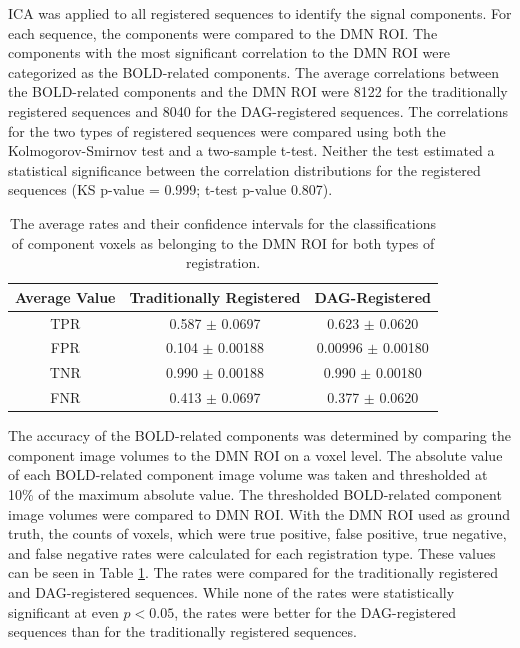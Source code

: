 ICA was applied to all registered sequences to identify the signal components. For each sequence, the components were compared to the DMN ROI. The components with the most significant correlation to the DMN ROI were categorized as the BOLD-related components. The average correlations between the BOLD-related components and the DMN ROI were 8122 for the traditionally registered sequences and 8040 for the DAG-registered sequences. The correlations for the two types of registered sequences were compared using both the Kolmogorov-Smirnov test and a two-sample t-test. Neither the test estimated a statistical significance between the correlation distributions for the registered sequences (KS p-value = 0.999; t-test p-value 0.807).

\begin{table}
\centering
\caption{The average rates and their confidence intervals for the classifications of component voxels as belonging to the DMN ROI for both types of registration.}
\label{tab:spectr-avg-rates}
\begin{tabular}{|c|c|c|}
\hline
\textbf{Average Value} & \textbf{Traditionally Registered} & \textbf{DAG-Registered} \\ \hline
TPR                    & 0.587 $\pm$ 0.0697                & 0.623 $\pm$ 0.0620      \\ \hline
FPR                    & 0.104 $\pm$ 0.00188               & 0.00996 $\pm$ 0.00180   \\ \hline
TNR                    & 0.990 $\pm$ 0.00188               & 0.990 $\pm$ 0.00180     \\ \hline
FNR                    & 0.413 $\pm$ 0.0697                & 0.377 $\pm$ 0.0620      \\ \hline
\end{tabular}
\vspace{0.05\textwidth}
\end{table}

The accuracy of the BOLD-related components was determined by comparing the component image volumes to the DMN ROI on a voxel level. The absolute value of each BOLD-related component image volume was taken and thresholded at 10\% of the maximum absolute value. The thresholded BOLD-related component image volumes were compared to DMN ROI. With the DMN ROI used as ground truth, the counts of voxels, which were true positive, false positive, true negative, and false negative rates were calculated for each registration type. These values can be seen in Table \ref{tab:spectr-avg-rates}. The rates were compared for the traditionally registered and DAG-registered sequences. While none of the rates were statistically significant at even $ p < 0.05$, the rates were better for the DAG-registered sequences than for the traditionally registered sequences. 


